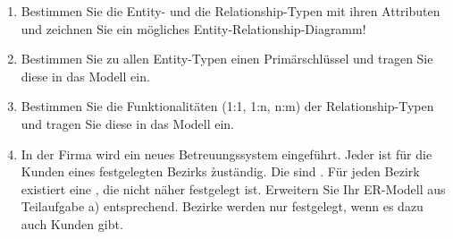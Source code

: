 \documentclass{bschlangaul-aufgabe}
\begin{document}
\begin{enumerate}


\item Bestimmen Sie die Entity- und die Relationship-Typen mit ihren
Attributen und zeichnen Sie ein mögliches Entity-Relationship-Diagramm!


\item Bestimmen Sie zu allen Entity-Typen einen Primärschlüssel und
tragen Sie diese in das Modell ein.


\item Bestimmen Sie die Funktionalitäten (1:1, 1:n, n:m) der
Relationship-Typen und tragen Sie diese in das Modell ein.


\item In der Firma wird ein neues Betreuungssystem eingeführt. Jeder
 ist für die Kunden eines festgelegten Bezirks
\r{zuständig}. Die  sind
. Für jeden Bezirk existiert eine
, die nicht näher festgelegt ist. Erweitern
Sie Ihr ER-Modell aus Teilaufgabe a) entsprechend. Bezirke werden nur
festgelegt, wenn es dazu auch Kunden gibt.

\end{enumerate}
\end{document}
